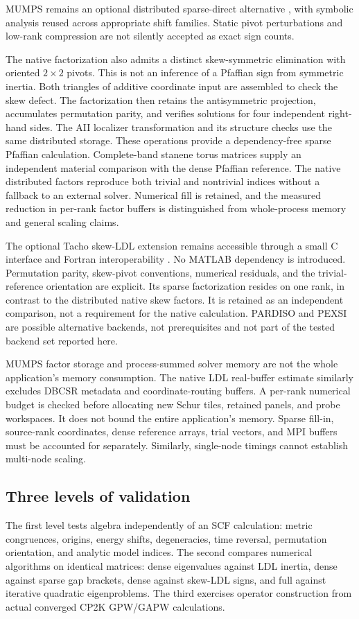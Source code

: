 MUMPS remains an optional distributed sparse-direct alternative
\cite{MumpsGuide}, with symbolic analysis reused across appropriate
shift families. Static pivot perturbations and low-rank compression
are not silently accepted as exact sign counts.

The native factorization also admits a distinct skew-symmetric
elimination with oriented $2\times2$ pivots. This is not an inference
of a Pfaffian sign from symmetric inertia.
Both triangles of additive coordinate input are assembled to check
the skew defect. The factorization then retains the antisymmetric
projection, accumulates permutation parity, and verifies solutions
for four independent right-hand sides. The AII localizer transformation
and its structure checks use the same distributed storage. These
operations provide a dependency-free sparse Pfaffian calculation.
Complete-band stanene torus matrices supply an independent material
comparison with the dense Pfaffian reference. The native distributed
factors reproduce both trivial and nontrivial indices without a
fallback to an external solver. Numerical fill is retained, and the
measured reduction in per-rank factor buffers is distinguished from
whole-process memory and general scaling claims.

The optional Tacho skew-LDL extension remains accessible through a small
C interface and Fortran interoperability \cite{TachoSkew}.
No MATLAB dependency is introduced.
Permutation parity, skew-pivot conventions, numerical residuals, and
the trivial-reference orientation are explicit.
Its sparse factorization resides on one rank, in contrast to the
distributed native skew factors. It is retained as an independent
comparison, not a requirement for the native calculation.
PARDISO and PEXSI are possible alternative backends, not prerequisites
and not part of the tested backend set reported here.

MUMPS factor storage and process-summed solver memory are not the
whole application's memory consumption.
The native LDL real-buffer estimate similarly excludes DBCSR
metadata and coordinate-routing buffers. A per-rank numerical budget
is checked before allocating new Schur tiles, retained panels, and
probe workspaces. It does not bound the entire application's memory.
Sparse fill-in, source-rank coordinates, dense reference arrays,
trial vectors, and MPI buffers must be accounted for separately.
Similarly, single-node timings cannot establish multi-node scaling.

\subsection{Three levels of validation}
The first level tests algebra independently of an SCF calculation:
metric congruences, origins, energy shifts, degeneracies, time
reversal, permutation orientation, and analytic model indices.
The second compares numerical algorithms on identical matrices:
dense eigenvalues against LDL inertia, dense against sparse gap
brackets, dense against skew-LDL signs, and full against iterative
quadratic eigenproblems.
The third exercises operator construction from actual converged
CP2K GPW/GAPW calculations.

